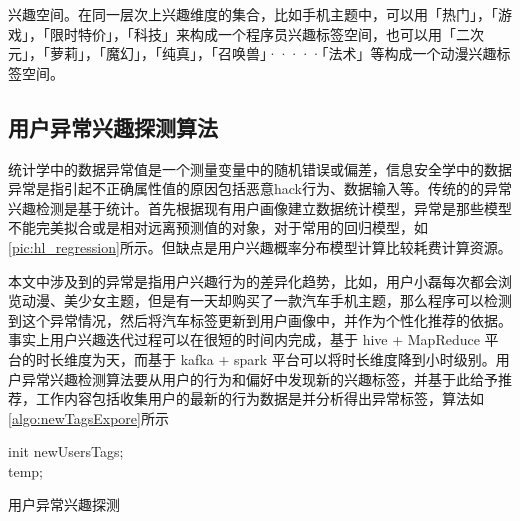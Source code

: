   兴趣空间。在同一层次上兴趣维度的集合，比如手机主题中，可以用「热门」，「游戏」，「限时特价」，「科技」来构成一个程序员兴趣标签空间，也可以用「二次元」，「萝莉」，「魔幻」，「纯真」，「召唤兽」·····「法术」等构成一个动漫兴趣标签空间。


  \subsection{用户异常兴趣探测算法}
  统计学中的数据异常值是一个测量变量中的随机错误或偏差，信息安全学中的数据异常是指引起不正确属性值的原因包括恶意hack行为、数据输入等。传统的的异常兴趣检测是基于统计。首先根据现有用户画像建立数据统计模型，异常是那些模型不能完美拟合或是相对远离预测值的对象，对于常用的回归模型，如\autoref{pic:hl_regression}所示。但缺点是用户兴趣概率分布模型计算比较耗费计算资源。
  \begin{figure}
  \centering
    \label{pic:hl_regression}
  \end{figure}

  本文中涉及到的异常是指用户兴趣行为的差异化趋势，比如，用户小磊每次都会浏览动漫、美少女主题，但是有一天却购买了一款汽车手机主题，那么程序可以检测到这个异常情况，然后将汽车标签更新到用户画像中，并作为个性化推荐的依据。事实上用户兴趣迭代过程可以在很短的时间内完成，基于 hive + MapReduce 平台的时长维度为天，而基于 kafka + spark 平台可以将时长维度降到小时级别。用户异常兴趣检测算法要从用户的行为和偏好中发现新的兴趣标签，并基于此给予推荐，工作内容包括收集用户的最新的行为数据是并分析得出异常标签，算法如\autoref{algo:newTagsExpore}所示
  \begin{algorithm}
  init newUsersTags;\\
  \Return temp;
  \caption{用户异常兴趣探测}
  \label{algo:newTagsExpore}
  \end{algorithm}


